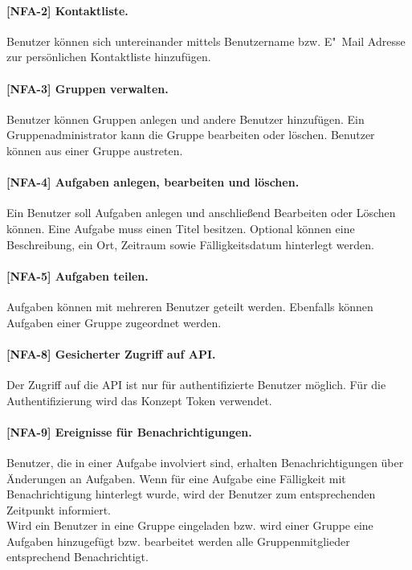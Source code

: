 \paragraph{[NFA-2] Kontaktliste.}\label{fa-2} Benutzer können sich untereinander mittels Benutzername bzw. E"~Mail Adresse zur persönlichen Kontaktliste hinzufügen.

\paragraph{[NFA-3] Gruppen verwalten. }\label{fa-3} Benutzer können Gruppen anlegen und andere Benutzer hinzufügen. Ein Gruppenadministrator kann die Gruppe bearbeiten oder löschen. Benutzer können aus einer Gruppe austreten.

\paragraph{[NFA-4] Aufgaben anlegen, bearbeiten und löschen.}\label{fa-4} Ein Benutzer soll Aufgaben anlegen und anschließend Bearbeiten oder Löschen können.
Eine Aufgabe muss einen Titel besitzen. Optional können eine Beschreibung, ein Ort, Zeitraum sowie Fälligkeitsdatum hinterlegt werden.

\paragraph{[NFA-5] Aufgaben teilen.} \label{fa-5} Aufgaben können mit mehreren Benutzer geteilt werden. Ebenfalls können Aufgaben einer Gruppe zugeordnet werden. 

\paragraph{[NFA-8] Gesicherter Zugriff auf API.} Der Zugriff auf die API ist nur für authentifizierte Benutzer möglich. Für die Authentifizierung wird das Konzept Token verwendet. \\

\paragraph{[NFA-9] Ereignisse für Benachrichtigungen.}\label{nfa-9} Benutzer, die in einer Aufgabe involviert sind, erhalten Benachrichtigungen über Änderungen an Aufgaben. Wenn für eine Aufgabe eine Fälligkeit mit Benachrichtigung hinterlegt wurde, wird der Benutzer zum entsprechenden Zeitpunkt informiert.\\
Wird ein Benutzer in eine Gruppe eingeladen bzw. wird einer Gruppe eine Aufgaben hinzugefügt bzw. bearbeitet werden alle Gruppenmitglieder entsprechend Benachrichtigt.

